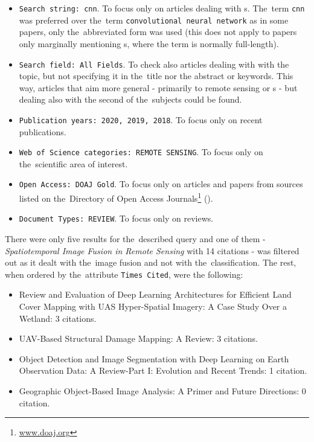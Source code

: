 \begin{itemize}
	\item \verb|Search string: cnn|. To focus only on articles dealing with s. The~term \verb|cnn| was preferred over the~term \verb|convolutional neural network| as in some papers, only the~abbreviated form was used (this does not apply to papers only marginally mentioning s, where the term is normally full-length).
	\item \verb|Search field: All Fields|. To check also articles dealing with with the topic, but not specifying it in the~title nor the abstract or keywords. This way, articles that aim more general - primarily to remote sensing or s - but dealing also with the second of the~subjects could be found.
	\item \verb|Publication years: 2020, 2019, 2018|. To focus only on recent publications.
	\item \verb|Web of Science categories: REMOTE SENSING|. To focus only on the~scien\-ti\-fic area of interest.
	\item \verb|Open Access: DOAJ Gold|. To focus only on articles and papers from sources listed on the~Di\-rectory of Open Access Journals\footnote{\url{www.doaj.org}} ().
	\item \verb|Document Types: REVIEW|. To focus only on reviews.
\end{itemize}

\noindent There were only five results for the~described query and one of them - \textit{Spatiotemporal Image Fusion in Remote Sensing} \cite{review-st-fusion} with 14 citations - was filtered out as it dealt with the~image fusion and not with the~classification. The rest, when ordered by the~attribute \verb|Times Cited|, were the following:

\begin{itemize}
	\item Review and Evaluation of Deep Learning Architectures for Efficient Land Cover Mapping with UAS Hyper-Spatial Imagery: A Case Study Over a Wetland: 3 citations. \cite{review-dl-wetlands}
	\item UAV-Based Structural Damage Mapping: A Review: 3 citations. \cite{uav-building-damages}
	\item Object Detection and Image Segmentation with Deep Learning on Earth Observation Data: A Review-Part I: Evolution and Recent Trends: 1 citation. \cite{review-dl-eo}
	\item Geographic Object-Based Image Analysis: A Primer and Future Directions: 0 citation. \cite{geobia}
\end{itemize}

